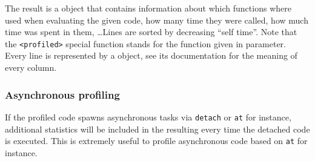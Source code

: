 The result is a  object that contains information about
which functions where used when evaluating the given code, how many time they
were called, how much time was spent in them, \ldots Lines are sorted by
decreasing ``self time''.  Note that the \lstinline|<profiled>| special
function stands for the function given in parameter.  Every line is
represented by a  object, see its documentation
for the meaning of every column.

\subsubsection{Asynchronous profiling}

If the profiled code spawns asynchronous tasks via \lstinline|detach| or
\lstinline|at| for instance, additional statistics will be included in the
resulting  every time the detached code is executed. This
is extremely useful to profile asynchronous code based on \lstinline|at| for
instance.

